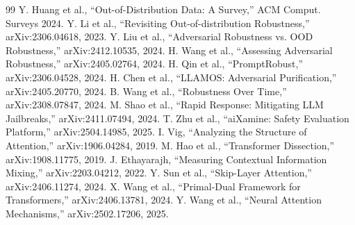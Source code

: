 \documentclass[12pt,a4paper]{report}
\begin{document}
\begin{thebibliography}{99}
 Y. Huang et al., ``Out-of-Distribution Data: A Survey,'' ACM Comput. Surveys 2024.
 Y. Li et al., ``Revisiting Out-of-distribution Robustness,'' arXiv:2306.04618, 2023.
 Y. Liu et al., ``Adversarial Robustness vs. OOD Robustness,'' arXiv:2412.10535, 2024.
 H. Wang et al., ``Assessing Adversarial Robustness,'' arXiv:2405.02764, 2024.
 H. Qin et al., ``PromptRobust,'' arXiv:2306.04528, 2024.
 H. Chen et al., ``LLAMOS: Adversarial Purification,'' arXiv:2405.20770, 2024.
 B. Wang et al., ``Robustness Over Time,'' arXiv:2308.07847, 2024.
 M. Shao et al., ``Rapid Response: Mitigating LLM Jailbreaks,'' arXiv:2411.07494, 2024.
 T. Zhu et al., ``aiXamine: Safety Evaluation Platform,'' arXiv:2504.14985, 2025.
 I. Vig, ``Analyzing the Structure of Attention,'' arXiv:1906.04284, 2019.
 M. Hao et al., ``Transformer Dissection,'' arXiv:1908.11775, 2019.
 J. Ethayarajh, ``Measuring Contextual Information Mixing,'' arXiv:2203.04212, 2022.
 Y. Sun et al., ``Skip-Layer Attention,'' arXiv:2406.11274, 2024.
 X. Wang et al., ``Primal-Dual Framework for Transformers,'' arXiv:2406.13781, 2024.
 Y. Wang et al., ``Neural Attention Mechanisms,'' arXiv:2502.17206, 2025.

\end{thebibliography}
\end{document}
